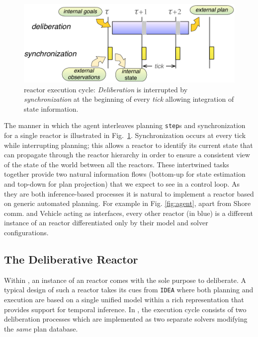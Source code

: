 \begin{figure}[!htbp]
  \centering
  \vskip-1pc
  \includegraphics[width=0.55\columnwidth]{figs/tick-cycle}
  \caption{\small \rx reactor execution cycle: {\em Deliberation} is
    interrupted by {\em synchronization} at the beginning of every
    {\em tick} allowing integration of state information.}
  \label{fig:tick-exec}
  \vskip-0.8pc
\end{figure}

The manner in which the agent interleaves planning \texttt{step}s and
synchronization for a single reactor is illustrated in
Fig.~\ref{fig:tick-exec}. Synchronization occurs at every tick while
interrupting planning; this allows a reactor to identify its current
state that can propagate through the reactor hierarchy in order to
ensure a consistent view of the state of the world between all the
reactors.
These intertwined tasks together provide two natural information flows
(bottom-up for state estimation and top-down for plan projection) that
we expect to see in a control loop. As they are both inference-based
processes it is natural to implement a reactor based on generic
automated planning. For example in Fig. \ref{fig:agent}, apart from
\textsf{Shore comm.} and \textsf{Vehicle} acting as interfaces, every
other reactor (in blue) is a different instance of an \eu reactor
differentiated only by their model and \eu solver configurations.

\subsection{The  Deliberative Reactor}
\label{sec:arch:europa}

Within \rx, an instance of an \eu reactor comes with the sole purpose
to deliberate. A typical design of such a reactor takes its cues from
\texttt{IDEA} \cite{mus02, mus06} where both planning and execution
are based on a single unified model within a rich representation that
provides support for temporal inference. In \rx, the execution cycle
consists of two deliberation processes which are implemented as two
separate \eu solvers modifying the \emph{same} plan database.

